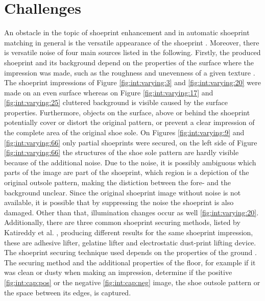 \documentclass[draft,final]{vutinfth} %
\begin{document}
\section{Challenges}
\par
An obstacle in the topic of shoeprint enhancement and in automatic shoeprint matching in general is the versatile appearance of the shoeprint \cite{kong2017cross}.
Moreover, there is versatile noise of  four main sources  listed in the following.
Firstly, the produced shoeprint and its background depend on the properties of the surface where the impression was made, such as the roughness and unevenness of a given texture \cite{shor2018inherent}.
The shoeprint impressions of Figure \ref{fig:int:varying:3} and \ref{fig:int:varying:20} were made on an even surface whereas on Figure \ref{fig:int:varying:17} and \ref{fig:int:varying:25} cluttered background is visible caused by the surface properties. %
Furthermore, objects on the surface, above or behind the shoeprint potentially cover or distort the original pattern, or prevent a clear impression of the complete area of the original shoe sole.
On Figures \ref{fig:int:varying:9} and \ref{fig:int:varying:66} only partial shoeprints were secured, on the left side of Figure \ref{fig:int:varying:66} the structures of the shoe sole pattern are hardly visible because of the additional noise.
Due to the noise, it is possibly ambiguous which parts of the image are part of the shoeprint, which region is a depiction of the original outsole pattern, making the distiction between the fore- and the background unclear.
Since the original shoeprint image without noise is not available, it is possible that by suppressing the noise the shoeprint is also damaged.
Other than that, illumination changes occur as well \ref{fig:int:varying:20}.
Additionally, there are three common shoeprint securing methods, listed by Katireddy et al. \cite{katireddy2017novel}, producing different results for the same shoeprint impression, these are adhesive lifter, gelatine lifter and electrostatic dust-print lifting device. 
The shoeprint securing technique used depends on the properties of the ground  \cite{katireddy2017novel}. 
The securing method and the additional properties of the floor, for example if it was clean or dusty when making an impression, determine if the positive \ref{fig:int:cap:pos} or the negative \ref{fig:int:cap:neg} image, the shoe outsole pattern or the space between its edges, is captured.
\end{document}
